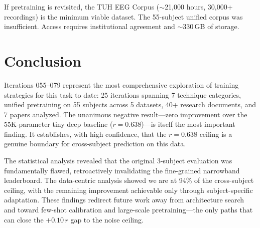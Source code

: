 \documentclass[11pt,a4paper]{article}
\begin{document}
If pretraining is revisited, the TUH EEG Corpus ($\sim$21,000 hours,
30,000+ recordings) is the minimum viable dataset. The 55-subject unified
corpus was insufficient. Access requires institutional agreement and
$\sim$330\,GB of storage.

\section{Conclusion}
\label{sec:conclusion}

Iterations 055--079 represent the most comprehensive exploration of
training strategies for this task to date: 25 iterations spanning 7
technique categories, unified pretraining on 55 subjects across 5 datasets,
40+ research documents, and 7 papers analyzed. The unanimous negative
result---zero improvement over the 55K-parameter tiny deep baseline
($r = 0.638$)---is itself the most important finding. It establishes, with
high confidence, that the $r = 0.638$ ceiling is a genuine boundary for
cross-subject prediction on this data.

The statistical analysis revealed that the original 3-subject evaluation
was fundamentally flawed, retroactively invalidating the fine-grained
narrowband leaderboard. The data-centric analysis showed we are at 94\%
of the cross-subject ceiling, with the remaining improvement achievable
only through subject-specific adaptation. These findings redirect future
work away from architecture search and toward few-shot calibration and
large-scale pretraining---the only paths that can close the $+0.10\,r$ gap
to the noise ceiling.
\end{document}
